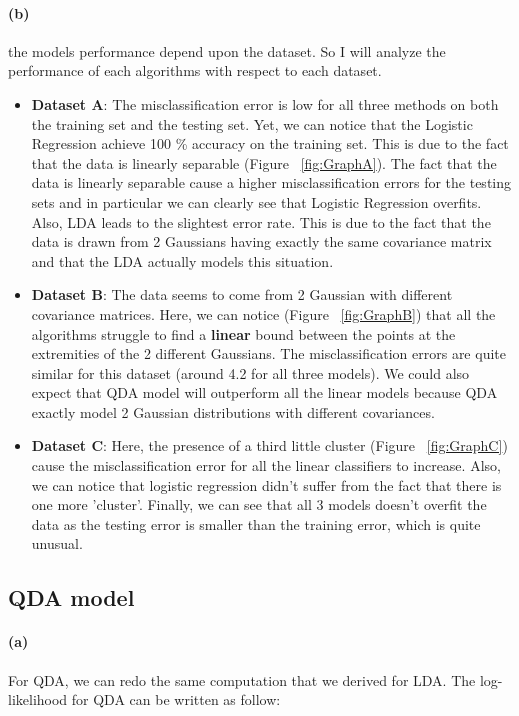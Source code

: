 \documentclass[11pt]{article}
\numberwithin{figure}{section} %
\begin{document}
\paragraph{(b)}
the models performance depend upon the dataset. So I will analyze the performance of each algorithms with respect to each dataset.
\begin{itemize}
\item \textbf{Dataset A}: 
The misclassification error is low for all three methods on both the training set and the testing set. Yet, we can notice that the Logistic Regression achieve 100 \% accuracy on the training set. This is due to the fact that the data is linearly separable (Figure ~\ref{fig:GraphA}). The fact that the data is linearly separable cause a higher misclassification errors for the testing sets and in particular we can clearly see that Logistic Regression overfits. Also, LDA leads to the slightest error rate. This is due to the fact that the data is drawn from 2 Gaussians having exactly the same covariance matrix and that the LDA actually models this situation.

\item \textbf{Dataset B}: 
The data seems to come from 2 Gaussian with different covariance matrices. Here, we can notice (Figure ~\ref{fig:GraphB}) that all the algorithms struggle to find a \textbf{linear} bound between the points at the extremities of the 2 different Gaussians. The misclassification errors are quite similar for this dataset (around 4.2 for all three models). We could also expect that QDA model will outperform all the linear models because QDA exactly model 2 Gaussian distributions with different covariances.

\item \textbf{Dataset C}: 
Here, the presence of a third little cluster (Figure ~\ref{fig:GraphC}) cause the misclassification error for all the linear classifiers to increase. Also, we can notice that logistic regression didn't suffer from the fact that there is one more 'cluster'. Finally, we can see that all 3 models doesn't overfit the data as the testing error is smaller than the training error, which is quite unusual.
\end{itemize}

\subsection{QDA model}
\paragraph{(a)} For QDA, we can redo the same computation that we derived for LDA. The log-likelihood for QDA can be written as follow:
\end{document}
